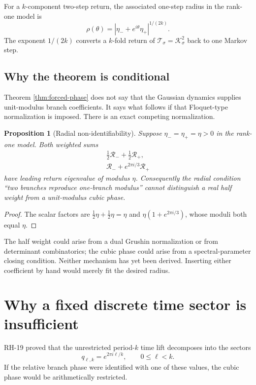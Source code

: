 \documentclass[11pt]{article}
\newtheorem{proposition}[theorem]{Proposition}
\theoremstyle{definition}
\theoremstyle{remark}
\newcommand{\cK}{\mathcal K}
\newcommand{\cT}{\mathcal T}
\newcommand{\cR}{\mathcal R}
\begin{document}
For a $k$-component two-step return, the associated one-step radius in the
rank-one model is
\begin{equation}\label{eq:one-step-radius}
 \rho(\theta)=
 |\eta_-+e^{i\theta}\eta_+|^{1/(2k)}.
\end{equation}
The exponent $1/(2k)$ converts a $k$-fold return of
$\cT_\sigma=\cK_\sigma^2$ back to one Markov step.

\subsection{Why the theorem is conditional}

Theorem \ref{thm:forced-phase} does not say that the Gaussian dynamics
supplies unit-modulus branch coefficients.  It says what follows if that
Floquet-type normalization is imposed.  There is an exact competing
normalization.

\begin{proposition}[Radial non-identifiability]
\label{prop:nonidentifiability}
Suppose $\eta_- =\eta_+=\eta>0$ in the rank-one model.  Both weighted sums
\begin{align}
 \frac12\cR_-+\frac12\cR_+,
 \label{eq:half-weight}\\
 \cR_-+e^{2\pi i/3}\cR_+
 \label{eq:cubic-weight}
\end{align}
have leading return eigenvalue of modulus $\eta$.  Consequently the radial
condition ``two branches reproduce one-branch modulus'' cannot distinguish
a real half weight from a unit-modulus cubic phase.
\end{proposition}

\begin{proof}
The scalar factors are
$\frac12\eta+\frac12\eta=\eta$ and
$\eta(1+e^{2\pi i/3})$, whose moduli both equal $\eta$.
\end{proof}

The half weight could arise from a dual Grushin normalization or from
determinant combinatorics; the cubic phase could arise from a
spectral-parameter closing condition.  Neither mechanism has yet been
derived.  Inserting either coefficient by hand would merely fit the desired
radius.

\section{Why a fixed discrete time sector is insufficient}
\label{sec:discrete-sector}

RH-19 proved that the unrestricted period-$k$ time lift decomposes into the
sectors
\begin{equation}\label{eq:discrete-sectors}
 q_{\ell,k}=e^{2\pi i\ell/k},
 \qquad0\le\ell<k.
\end{equation}
If the relative branch phase were identified with one of these values, the
cubic phase would be arithmetically restricted.
\end{document}
